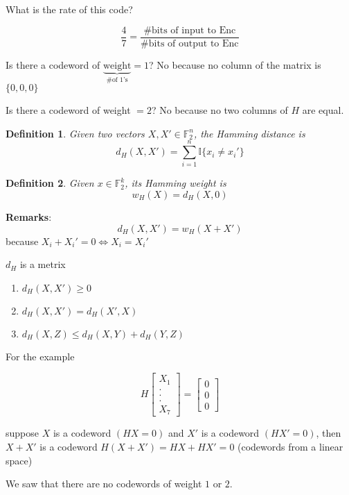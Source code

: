 \documentclass{article}
\newtheorem{definition}{Definition}[section]
\theoremstyle{definition} %
\def\F{\mathbb{F}}
\def\I{\mathbb{I}}
\begin{document}
What is the rate of this code?

\[
  \frac{4}{7} = \frac{\# \text{bits of input to Enc}}{\# \text{bits of output to Enc}}
\]

Is there a codeword of $\underbrace{\text{weight}}_{\# \text{of 1's}} = 1$?
No because no column of the matrix is $\{0, 0, 0\}$

Is there a codeword of weight $= 2$? No because no two columns of $H$ are equal.

\begin{definition}
  Given two vectors $X, X' \in \F^n_2$, the Hamming distance is
  \[
    d_H(X, X') = \sum_{i = 1}^n \I\{ x_i \neq x_i'\}
  \]
\end{definition}

\begin{definition}
  Given $x \in \F_2^k$, its Hamming weight is
  \[
    w_H(X) = d_H(X, 0)
  \]
\end{definition}

\textbf{Remarks}: \\
\[
  d_H(X, X') = w_H(X + X')
\]
because $X_i + X_i' = 0 \Leftrightarrow X_i = X_i'$

$d_H$ is a metrix
\begin{enumerate}
  \item $d_H(X, X') \geq 0$ \\
  \item $d_H(X, X') = d_H(X', X)$
  \item $d_H(X, Z) \leq d_H(X, Y) + d_H(Y, Z)$
\end{enumerate}

For the example

\[
  H
  \left[
    \begin{array}{c}
      X_1 \\
      . \\
      . \\
      . \\
      X_7
    \end{array}
  \right]
  =
  \left[
    \begin{array}{c}
      0 \\
      0 \\
      0
    \end{array}
  \right]
\]

suppose $X$ is a codeword $(HX = 0)$ and $X'$ is a codeword $(H X' = 0)$, then $X + X'$ is a codeword $H(X+ X') = HX + HX' = 0$ (codewords from a linear space)

We saw that there are no codewords of weight $1$ or $2$.
\end{document}
